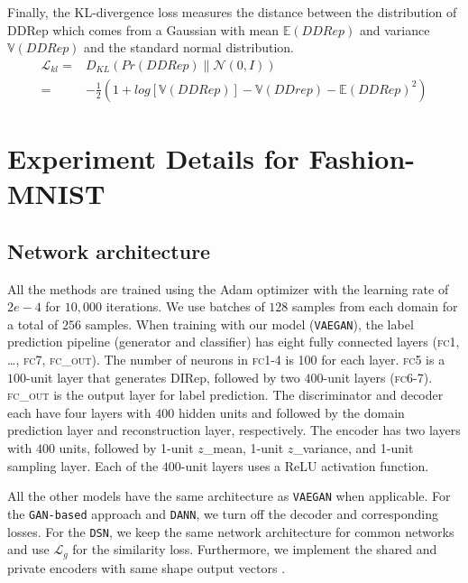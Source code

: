 \documentclass{article}
\begin{document}
Finally, the KL-divergence loss measures the distance between the distribution of DDRep which comes from a Gaussian  with mean $\mathbb{E}(DDRep)$ and variance $\mathbb{V}(DDRep)$ and the standard normal distribution. 
\begin{align}
    \mathcal{L}_{kl} = & D_{KL}(Pr(DDRep)\parallel\mathcal{N}(0,I) )\nonumber \\
    = & -\frac{1}{2}(1 + log[\mathbb{V}(DDRep)]  
    -  \mathbb{V}(DDrep) - \mathbb{E}(DDRep)^2)
\end{align}%




\section{Experiment Details for Fashion-MNIST}\label{appfm}



\subsection{Network architecture} 
All the methods are trained using the Adam optimizer with the learning rate of $2e-4$ for $10,000$ iterations. We use batches of $128$ samples from each domain for a total of $256$ samples. When training with our model (\verb"VAEGAN"), the label prediction pipeline (generator and classifier) has eight fully connected layers (\textsc{fc1, \ldots, fc7, fc\_out}). The number of neurons in \textsc{fc1-4} is 100 for each layer. \textsc{fc5} is a $100$-unit layer that generates DIRep, followed by two $400$-unit layers (\textsc{fc6-7}). \textsc{fc\_out} is the output layer for label prediction. The discriminator and decoder each have four layers with $400$ hidden units and followed by the domain prediction layer and reconstruction layer, respectively. The encoder has two layers with $400$ units, followed by 1-unit $z$\_mean, 1-unit $z$\_variance, and 1-unit sampling layer. Each of the $400$-unit layers uses a ReLU activation function. 

All the other models have the same architecture as \verb"VAEGAN" when applicable. For the \verb"GAN-based" approach and \verb"DANN", we turn off the decoder and corresponding losses. For the \verb"DSN", we keep the same network architecture for common networks and use $\mathcal{L}_g$  for the similarity loss. Furthermore, we implement the shared and private encoders with same shape output vectors \cite{bousmalis2016domain}.
\end{document}
